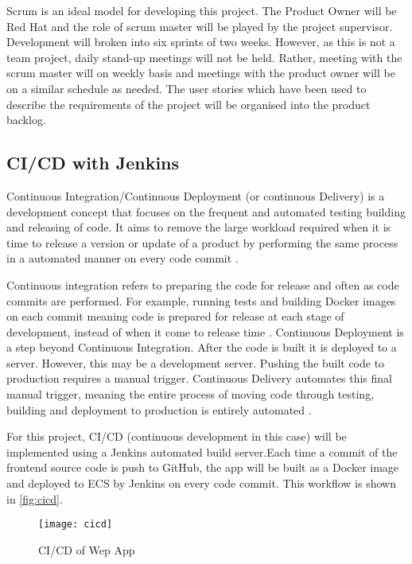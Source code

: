 	Scrum is an ideal model for developing this project. The Product Owner will be Red Hat and the role of scrum master will be played by the project supervisor. Development will broken into six sprints of two weeks. However, as this is not a team project, daily stand-up meetings will not be held. Rather, meeting with the scrum master will on weekly basis and meetings with the product owner will be on a similar schedule as needed. The user stories which have been used to describe the requirements of the project will be organised into the product backlog.
	
	\subsection{CI/CD with Jenkins}
	Continuous Integration/Continuous Deployment (or continuous Delivery) is a development concept that focuses on the frequent and automated testing building and releasing of code. It aims to remove the large workload required when it is time to release a version or update of a product by performing the same process in a automated manner on every code commit \citep{pittet}.
	
	Continuous integration refers to preparing the code for release and often as code commits are performed. For example, running tests and building Docker images on each commit meaning code is prepared for release at each stage of development, instead of when it come to release time \citep{ramos}.
	Continuous Deployment is a step beyond Continuous Integration. After the code is built it is deployed to a server. However, this may be a development server. Pushing the built code to production requires a manual trigger. Continuous Delivery automates this final manual trigger, meaning the entire process of moving code through testing, building and deployment to production is entirely automated \citep{ellingwood}.
	
	For this project, CI/CD (continuous development in this case) will be implemented using a Jenkins automated build server.Each time a commit of the frontend source code is push to GitHub, the app will be built as a Docker image and deployed to ECS by Jenkins on every code commit. This workflow is shown in \autoref{fig:cicd}.
	
	\begin{figure}[H]
		\setlength{\belowcaptionskip}{15pt plus 3pt minus 2pt}
		\caption{CI/CD of Wep App}
		\centering
		\texttt{[image: cicd]}
		\label{fig:cicd}
	\end{figure}
	
